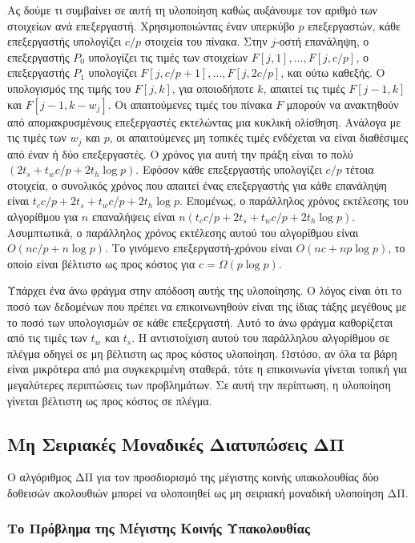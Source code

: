 \documentclass[12pt,a4paper]{article} %
\begin{document}
{{Ας δούμε τι συμβαίνει σε αυτή τη υλοποίηση καθώς αυξάνουμε τον
αριθμό των στοιχείων ανά επεξεργαστή. Χρησιμοποιώντας έναν υπερκύβο
$p$ επεξεργαστών, κάθε επεξεργαστής υπολογίζει $c/p$ στοιχεία του
πίνακα. Στην $j$-οστή επανάληψη, ο επεξεργαστής $P_0$ υπολογίζει
τις τιμές των στοιχείων $F[j, 1], \ldots, F[j, c/p]$, ο επεξεργαστής
$P_1$ υπολογίζει $F[j, c/p+1], \ldots, F[j, 2c/p]$, και ούτω καθεξής.
Ο υπολογισμός της τιμής του $F[j, k]$, για οποιοδήποτε $k$, απαιτεί
τις τιμές $F[j-1, k]$ και $F[j-1, k-w_j]$. Οι απαιτούμενες τιμές
του πίνακα $F$ μπορούν να ανακτηθούν από απομακρυσμένους επεξεργαστές
εκτελώντας μια κυκλική ολίσθηση. Ανάλογα με τις τιμές των $w_j$ και
$p$, οι απαιτούμενες μη τοπικές τιμές ενδέχεται να είναι διαθέσιμες
από έναν ή δύο επεξεργαστές. Ο χρόνος για αυτή την πράξη είναι το
πολύ $(2t_s + t_w c/p + 2t_h \log p)$. Εφόσον κάθε
επεξεργαστής υπολογίζει $c/p$ τέτοια στοιχεία, ο συνολικός χρόνος
που απαιτεί ένας επεξεργαστής για κάθε επανάληψη είναι
$t_c c/p + 2t_s + t_w c/p + 2t_h \log p$. Επομένως, ο παράλληλος
χρόνος εκτέλεσης του αλγορίθμου για $n$ επαναλήψεις είναι
$n(t_c c/p + 2t_s + t_w c/p + 2t_h \log p)$. Ασυμπτωτικά, ο
παράλληλος χρόνος εκτέλεσης αυτού του αλγορίθμου είναι
$O(nc/p + n \log p)$. Το γινόμενο επεξεργαστή-χρόνου είναι
$O(nc + np \log p)$, το οποίο είναι βέλτιστο ως προς κόστος για
$c = \Omega(p \log p)$.

Υπάρχει ένα άνω φράγμα στην απόδοση αυτής της υλοποίησης. Ο λόγος
είναι ότι το ποσό των δεδομένων που πρέπει να επικοινωνηθούν είναι
της ίδιας τάξης μεγέθους με το ποσό των υπολογισμών σε κάθε
επεξεργαστή. Αυτό το άνω φράγμα καθορίζεται από τις τιμές των $t_w$
και $t_s$. Η αντιστοίχιση αυτού του παράλληλου
αλγορίθμου σε πλέγμα οδηγεί σε μη βέλτιστη ως προς κόστος υλοποίηση. 
Ωστόσο, αν όλα τα βάρη είναι μικρότερα από μια
συγκεκριμένη σταθερά, τότε η επικοινωνία γίνεται τοπική για
μεγαλύτερες περιπτώσεις των προβλημάτων. Σε αυτή την περίπτωση, η
υλοποίηση γίνεται βέλτιστη ως προς κόστος σε πλέγμα.

\subsection[Μη Σειριακές Μοναδικές Διατυ\-πώσεις ΔΠ]{Μη Σειριακές Μοναδικές Διατυπώσεις ΔΠ}

Ο αλγόριθμος ΔΠ για τον προσδιορισμό της μέγιστης κοινής
υπακολουθίας δύο δοθεισών ακολουθιών μπορεί να υλοποιηθεί ως μη
σειριακή μοναδική υλοποίηση ΔΠ.

\subsubsection[Το Πρόβλημα της Μέγιστης Κοινής Υπα\-κο\-λου\-θίας]{Το Πρόβλημα της Μέγιστης Κοινής Υπακολουθίας}

}}
\end{document}

